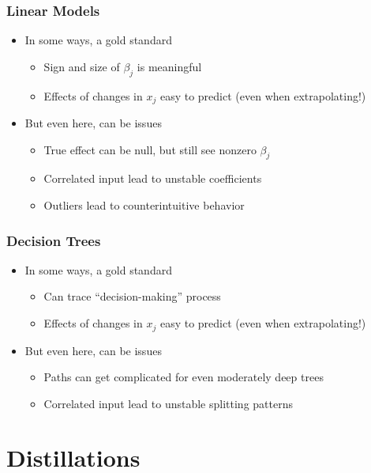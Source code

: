 \documentclass[10pt,mathserif]{beamer}
\begin{document}
\begin{frame}
  \frametitle{Linear Models}
\begin{itemize}
  \item In some ways, a gold standard
    \begin{itemize}
    \item Sign and size of $\beta_j$ is meaningful
    \item Effects of changes in $x_j$ easy to predict (even when extrapolating!)
    \end{itemize}
  \item But even here, can be issues
    \begin{itemize}
    \item True effect can be null, but still see nonzero $\beta_j$
    \item Correlated input lead to unstable coefficients
    \item Outliers lead to counterintuitive behavior
    \end{itemize}
\end{itemize}
\end{frame}

\begin{frame}
  \frametitle{Decision Trees}
\begin{itemize}
  \item In some ways, a gold standard
    \begin{itemize}
    \item Can trace ``decision-making'' process
    \item Effects of changes in $x_j$ easy to predict (even when extrapolating!)
    \end{itemize}
  \item But even here, can be issues
    \begin{itemize}
    \item Paths can get complicated for even moderately deep trees
    \item Correlated input lead to unstable splitting patterns
    \end{itemize}
\end{itemize}
\end{frame}


\section{Distillations}
\end{document}
